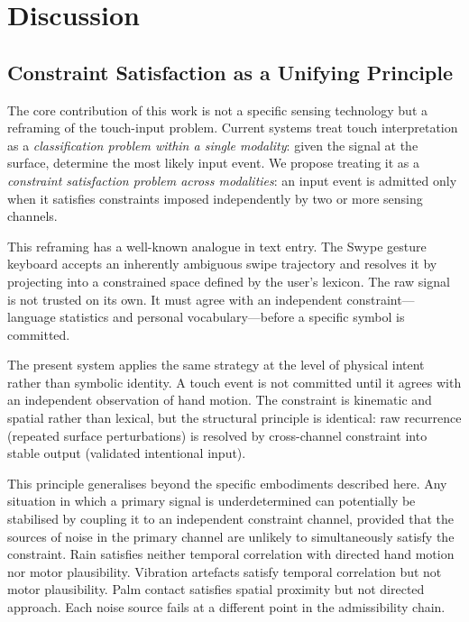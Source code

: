 \documentclass[11pt,letterpaper]{article}
\begin{document}
\section{Discussion}
\label{sec:discussion}

\subsection{Constraint Satisfaction as a Unifying Principle}

The core contribution of this work is not a specific sensing technology but a
reframing of the touch-input problem. Current systems treat touch interpretation as
a \emph{classification problem within a single modality}: given the signal at the
surface, determine the most likely input event. We propose treating it as a
\emph{constraint satisfaction problem across modalities}: an input event is admitted
only when it satisfies constraints imposed independently by two or more sensing
channels.

This reframing has a well-known analogue in text entry. The Swype gesture keyboard
accepts an inherently ambiguous swipe trajectory and resolves it by projecting into
a constrained space defined by the user's lexicon. The raw signal is not trusted on
its own. It must agree with an independent constraint---language statistics and
personal vocabulary---before a specific symbol is committed.

The present system applies the same strategy at the level of physical intent rather
than symbolic identity. A touch event is not committed until it agrees with an
independent observation of hand motion. The constraint is kinematic and spatial
rather than lexical, but the structural principle is identical: raw recurrence
(repeated surface perturbations) is resolved by cross-channel constraint into
stable output (validated intentional input).

This principle generalises beyond the specific embodiments described here. Any
situation in which a primary signal is underdetermined can potentially be stabilised
by coupling it to an independent constraint channel, provided that the sources of
noise in the primary channel are unlikely to simultaneously satisfy the constraint.
Rain satisfies neither temporal correlation with directed hand motion nor motor
plausibility. Vibration artefacts satisfy temporal correlation but not motor
plausibility. Palm contact satisfies spatial proximity but not directed approach.
Each noise source fails at a different point in the admissibility chain.
\end{document}
